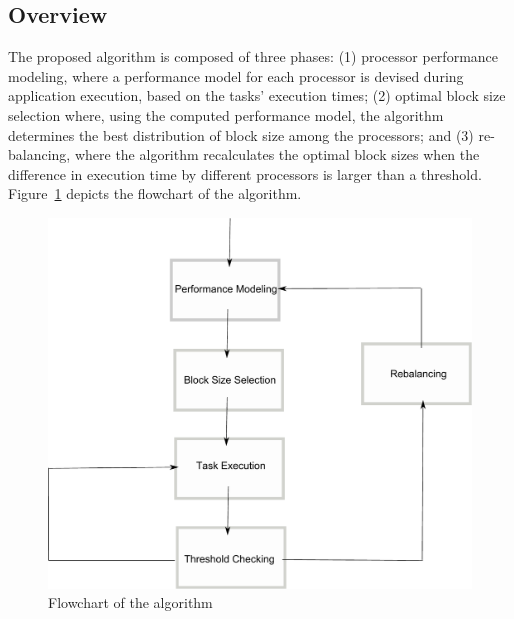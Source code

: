 \documentclass[journal]{IEEEtran}
\begin{document}
\subsection{Overview}
The proposed algorithm is composed of three phases: (1) processor 
performance modeling, where a performance model for each processor is devised
during application execution, based on the tasks' execution times; (2) optimal block
size selection where, using the computed performance model, the algorithm determines
the best distribution of block size among the processors; and (3) re-balancing,
where the algorithm recalculates the optimal block sizes when the difference in
execution time by different processors is larger than a threshold. Figure~\ref{fig: fluxo1} depicts the flowchart of the algorithm.

%
\begin{figure}[!t]
	\centering
			\includegraphics[width=.8\linewidth]{Fluxo.pdf} 				
	\caption{Flowchart of the algorithm}
	\label{fig: fluxo1}
\end{figure}
\end{document}
